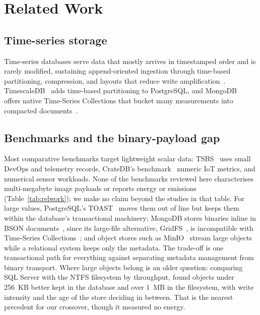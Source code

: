 \documentclass[pdflatex,sn-basic]{sn-jnl}%
\begin{document}
\section{Related Work}\label{sec:related_work}

\subsection{Time-series storage}
{\color{markup}Time-series databases serve data that mostly arrives in timestamped order and is rarely modified, sustaining append-oriented ingestion through time-based partitioning, compression, and layouts that reduce write amplification~\citep{dewaal_timeseries_survey,jensen_tsms_survey}.} {\color{markup}TimescaleDB~\citep{timescaledb_official} adds time-based partitioning to PostgreSQL, and MongoDB~\citep{mongodb_official} offers native Time-Series Collections that bucket many measurements into compacted documents~\citep{mongodb_timeseries_collections_guide,mongodb_ts_best_practices}.}

\subsection{Benchmarks and the binary-payload gap}\label{subsec:benchmarks}
{\color{markup}Most comparative benchmarks target lightweight scalar data: TSBS~\citep{tsbs} uses small DevOps and telemetry records, CrateDB's benchmark~\citep{cratedb_ts_benchmark} numeric IoT metrics, and \citet{diva_timescaledb_mongodb_eval} numerical sensor workloads.} {\color{markup}None of the benchmarks reviewed here characterises multi-megabyte image payloads or reports energy or emissions (Table~\ref{tab:relwork}); we make no claim beyond the studies in that table.} {\color{markup}For large values, PostgreSQL's TOAST~\citep{postgresql_toast_docs} moves them out of line but keeps them within the database's transactional machinery; MongoDB stores binaries inline in BSON documents~\citep{mongodb_bson_spec}, since its large-file alternative, GridFS~\citep{mongodb_gridfs}, is incompatible with Time-Series Collections~\citep{mongodb_ts_limitations}; and object stores such as MinIO~\citep{minio_official} stream large objects while a relational system keeps only the metadata.} {\color{markup}The trade-off is one transactional path for everything against separating metadata management from binary transport.} {\color{markup}Where large objects belong is an older question: comparing SQL Server with the NTFS filesystem by throughput, \citet{sears_blob_filesystem} found objects under 256~KB better kept in the database and over 1~MB in the filesystem, with write intensity and the age of the store deciding in between.} {\color{markup}That is the nearest precedent for our crossover, though it measured no energy.}
\end{document}
